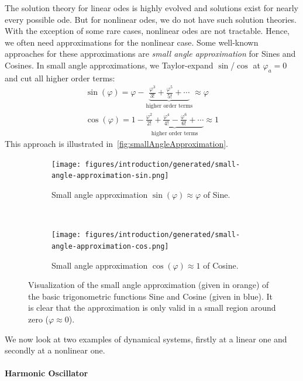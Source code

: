 	The solution theory for linear \acp{ode} is highly evolved and solutions exist for nearly every possible \ac{ode}. But for nonlinear \acp{ode}, we do not have such solution theories. With the exception of some rare cases, nonlinear \acp{ode} are not tractable. Hence, we often need approximations for the nonlinear case. Some well-known approaches for these approximations are \eg \emph{small angle approximation} for Sines and Cosines. In small angle approximations, we Taylor-expand \( \sin \)/\( \cos \) at \( \varphi_a = 0 \) and cut all higher order terms:
	\begin{gather*}
		\sin(\varphi) = \varphi - \underbrace{\frac{\varphi^3}{3!} + \frac{\varphi^5}{5!} + \cdots}_\text{higher order terms} \approx \varphi \\
		\cos(\varphi) = 1 - \underbrace{\frac{\varphi^2}{2!} + \frac{\varphi^4}{4!} - \frac{\varphi^6}{6!} + \cdots}_\text{higher order terms} \approx 1
	\end{gather*}
	This approach is illustrated in~\autoref{fig:smallAngleApproximation}.

	\begin{figure}
		\centering
		\begin{subfigure}[t]{0.5\linewidth}
			\centering
			\texttt{[image: figures/introduction/generated/small-angle-approximation-sin.png]}
			\caption[Small angle approximation of sine]{Small angle approximation \( \sin(\varphi) \approx \varphi \) of Sine.}
		\end{subfigure}%
		~
		\begin{subfigure}[t]{0.5\linewidth}
			\centering
			\texttt{[image: figures/introduction/generated/small-angle-approximation-cos.png]}
			\caption[Small angle approximation of cosine]{Small angle approximation \( \cos(\varphi) \approx 1 \) of Cosine.}
		\end{subfigure}
		\caption[Small angle approximation of sine and cosine]{Visualization of the small angle approximation (given in orange) of the basic trigonometric functions Sine and Cosine (given in blue). It is clear that the approximation is only valid in a small region around zero (\( \varphi \approx 0 \)).}
		\label{fig:smallAngleApproximation}
	\end{figure}

	We now look at two examples of dynamical systems, firstly at a linear one and secondly at a nonlinear one.

	\paragraph{Harmonic Oscillator}
		\label{subsec:harmonicOscillator}

